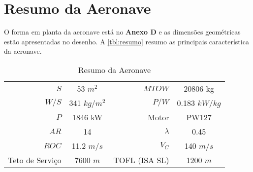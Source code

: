 \chapter{Resumo da Aeronave}
\label{tabelaresumo}

O forma em planta da aeronave está no \textbf{Anexo D} e as dimensões geométricas estão apresentadas no desenho. A \autoref{tbl:resumo} resumo as principais característica da aeronave.

\begin{table}[H]
\centering
\begin{tabular}{rcrc}
\toprule
$S$ & 53 $m^2$ & $MTOW$  & 20806 kg\\
$W/S$ & 341 $kg/m^2$ & $P/W$  & 0.183 $kW/kg$ \\
$P$ & 1846 kW & Motor & PW127 \\
$AR$ & 14 & $\lambda$ & 0.45 \\
$ROC$ & 11.2 $m/s$ & $V_C$ & 140 $m/s$ \\
Teto de Serviço & 7600 $m$ & TOFL (ISA SL) & 1200 $m$ \\
\bottomrule
\end{tabular}
\caption{Resumo da Aeronave}
\label{tbl:resumo}
\end{table}
